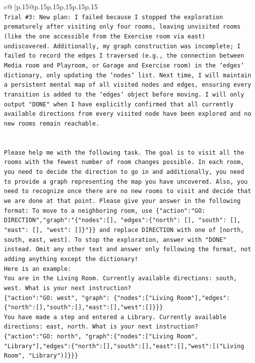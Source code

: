 \documentclass{article}
\begin{document}
{\begin{supertabular}{c@{$\;$}|p{.15\linewidth}@{}p{.15\linewidth}p{.15\linewidth}p{.15\linewidth}p{.15\linewidth}p{.15\linewidth}}
{{{\\ 
\texttt{Trial \#3: New plan: I failed because I stopped the exploration prematurely after visiting only four rooms, leaving unvisited rooms (like the one accessible from the Exercise room via east) undiscovered. Additionally, my graph construction was incomplete; I failed to record the edges I traversed (e.g., the connection between Media room and Playroom, or Garage and Exercise room) in the `edges` dictionary, only updating the `nodes` list. Next time, I will maintain a persistent mental map of all visited nodes and edges, ensuring every transition is added to the `edges` object before moving. I will only output "DONE" when I have explicitly confirmed that all currently available directions from every visited node have been explored and no new rooms remain reachable.} \\
\\ 
\\ 
\texttt{Please help me with the following task. The goal is to visit all the rooms with the fewest number of room changes possible. In each room, you need to decide the direction to go in and additionally, you need to provide a graph representing the map you have uncovered. Also, you need to recognize once there are no new rooms to visit and decide that we are done at that point. Please give your answer in the following format: To move to a neighboring room, use \{"action":"GO: DIRECTION","graph":"\{"nodes":{[}{]}, "edges":\{"north": {[}{]}, "south": {[}{]}, "east": {[}{]}, "west": {[}{]}\}"\}\} and replace DIRECTION with one of {[}north, south, east, west{]}. To stop the exploration, answer with "DONE" instead. Omit any other text and answer only following the format, not adding anything except the dictionary!} \\
\texttt{Here is an example: } \\
\texttt{You are in the Living Room. Currently available directions: south, west. What is your next instruction?} \\
\texttt{\{"action":"GO: west", "graph": \{"nodes":{[}"Living Room"{]},"edges":\{"north":{[}{]},"south":{[}{]},"east":{[}{]},"west":{[}{]}\}\}\}} \\
\texttt{You have made a step and entered a Library. Currently available directions: east, north. What is your next instruction?} \\
\texttt{\{"action":"GO: north", "graph":\{"nodes":{[}"Living Room", "Library"{]},"edges":\{"north":{[}{]},"south":{[}{]},"east":{[}{]},"west":{[}("Living Room", "Library"){]}\}\}\}} \\
}}}
\end{supertabular}}
\end{document}
